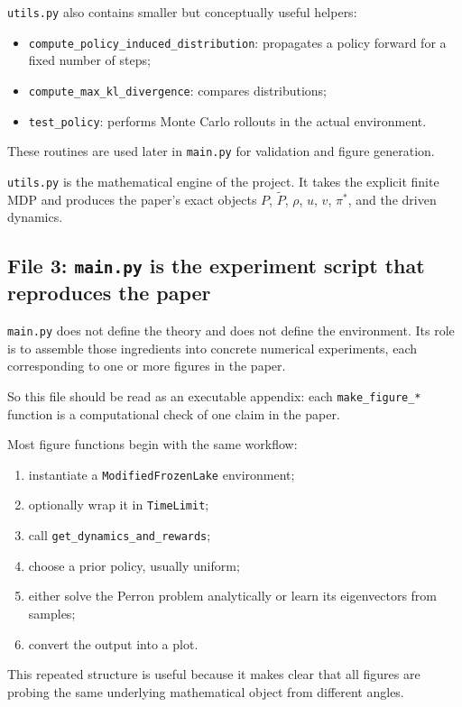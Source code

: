 \documentclass[11pt]{article}
\begin{document}
\texttt{utils.py} also contains smaller but conceptually useful helpers:
\begin{itemize}
    \item \texttt{compute\_policy\_induced\_distribution}: propagates a policy forward for a
    fixed number of steps;
    \item \texttt{compute\_max\_kl\_divergence}: compares distributions;
    \item \texttt{test\_policy}: performs Monte Carlo rollouts in the actual environment.
\end{itemize}
These routines are used later in \texttt{main.py} for validation and figure generation.

\medskip
\texttt{utils.py} is the mathematical engine of the project. It takes the explicit finite MDP
and produces the paper's exact objects \(P\), \(\widetilde{P}\), \(\rho\), \(u\), \(v\),
\(\pi^*\), and the driven dynamics.

\subsection*{File 3: \texttt{main.py} is the experiment script that reproduces the paper}

\texttt{main.py} does not define the theory and does not define the environment. Its role is
to assemble those ingredients into concrete numerical experiments, each corresponding to one
or more figures in the paper.

So this file should be read as an executable appendix: each \texttt{make\_figure\_*} function
is a computational check of one claim in the paper.

Most figure functions begin with the same workflow:
\begin{enumerate}
    \item instantiate a \texttt{ModifiedFrozenLake} environment;
    \item optionally wrap it in \texttt{TimeLimit};
    \item call \texttt{get\_dynamics\_and\_rewards};
    \item choose a prior policy, usually uniform;
    \item either solve the Perron problem analytically or learn its eigenvectors from samples;
    \item convert the output into a plot.
\end{enumerate}
This repeated structure is useful because it makes clear that all figures are probing the same
underlying mathematical object from different angles.
\end{document}
